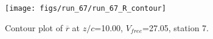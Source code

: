 \begin{figure}[H]
\centering
\texttt{[image: figs/run\_67/run\_67\_R\_contour]}
\caption{Contour plot of $\overline{r}$ at $z/c$=10.00, $V_{free}$=27.05, station 7.}
\end{figure}


